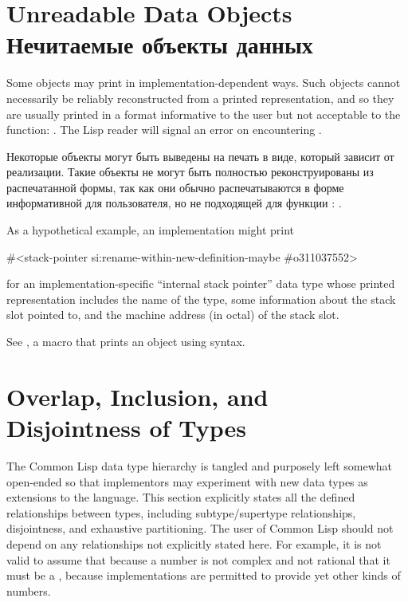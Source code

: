 \section{Unreadable Data Objects Нечитаемые объекты данных}

Some objects may print in implementation-dependent ways.
Such objects cannot necessarily be reliably reconstructed from
a printed representation, and so they are usually printed in
a format informative to the user but not acceptable to the  function:
.
The Lisp reader will signal an error on encountering \cd{\#<}.

Некоторые объекты могут быть выведены на печать в виде, который зависит от
реализации.
Такие объекты не могут быть полностью реконструированы из распечатанной формы,
так как они обычно распечатываются в форме информативной для пользователя, но не
подходящей для функции :
.

As a hypothetical example, an implementation might print
\begin{lisp}
\#<stack-pointer si:rename-within-new-definition-maybe \#o311037552>
\end{lisp}
for an implementation-specific ``internal stack pointer'' data type
whose printed representation includes the name of the type,
some information about the stack slot pointed to, and the machine address
(in octal) of the stack slot.

\begin{newer}
See , a macro that prints an object using \cd{\#<}
syntax.
\end{newer}

\section{Overlap, Inclusion, and Disjointness of Types}
\label{DATA-TYPE-RELATIONSHIPS}

The Common Lisp data type hierarchy is tangled and purposely left somewhat
open-ended so that implementors may experiment with new data types
as extensions to the language.  This section explicitly states all
the defined relationships between types, including subtype/supertype
relationships,
disjointness, and exhaustive partitioning.  The user of Common Lisp
should not depend on any relationships not explicitly stated here.
For example, it is not valid to assume that because a number
is not complex and not rational that it must be a , because
implementations are permitted to provide yet other kinds of numbers.

